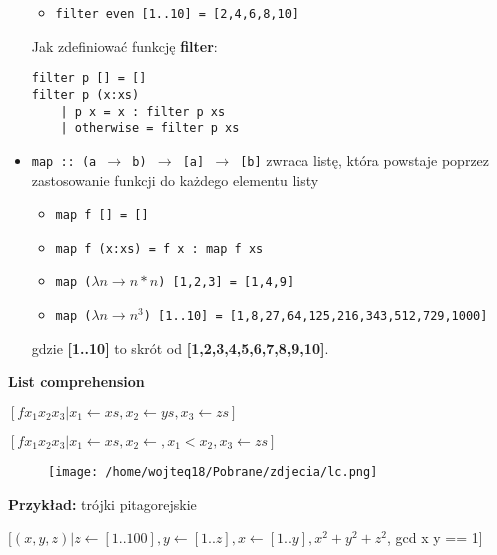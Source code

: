 \documentclass{article}
\begin{document}
\begin{itemize}
\begin{itemize}
            \item \texttt{filter even [1..10] = [2,4,6,8,10]}
        \end{itemize}
        Jak zdefiniować funkcję \textbf{filter}:
        \begin{Verbatim}[frame=single]
filter p [] = []
filter p (x:xs)
    | p x = x : filter p xs
    | otherwise = filter p xs
        \end{Verbatim}
    \item \texttt{map :: (a \(\to\) b) \(\to\) [a] \(\to\) [b]} \newline
        zwraca listę, która powstaje poprzez zastosowanie funkcji do każdego elementu listy
        \begin{itemize}
            \item \texttt{map f [] = []}
            \item \texttt{map f (x:xs) = f x : map f xs}
            \item \texttt{map (\(\lambda n \to n*n\)) [1,2,3] = [1,4,9]}
            \item \texttt{map (\(\lambda n \to n^3\)) [1..10] = [1,8,27,64,125,216,343,512,729,1000]}
        \end{itemize}
        gdzie \textbf{[1..10]} to skrót od \textbf{[1,2,3,4,5,6,7,8,9,10]}.
\end{itemize}
\vspace{1\baselineskip}
\textbf{List comprehension} \par
\vspace{1\baselineskip}
$[f x_1 x_2 x_3 | x_1 \leftarrow xs, x_2 \leftarrow ys, x_3 \leftarrow zs]$ \par
$[f x_1 x_2 x_3 | x_1 \leftarrow xs, x_2 \leftarrow, x_1 < x_2, x_3 \leftarrow zs]$
\vspace{1\baselineskip}
\begin{figure}[H]
    \centering
    \texttt{[image: /home/wojteq18/Pobrane/zdjecia/lc.png]}
    \label{fig:example_image}
\end{figure}
\vspace{1\baselineskip}
\textbf{Przykład: } trójki pitagorejskie \par
\vspace{1\baselineskip}
$[(x, y, z) | z \leftarrow [1..100], y \leftarrow [1..z], x \leftarrow [1..y], x^2 + y^2 + z^2$, gcd x y == 1] \par
\end{document}
